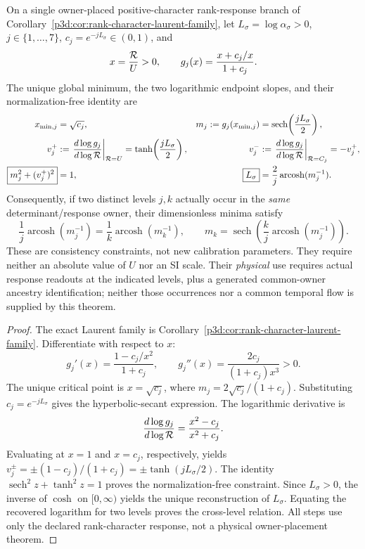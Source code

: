 \documentclass[12pt,a4paper]{article}
\begin{document}
\begin{theorem}
\label{p3d:thm:v285-calibration-free-hierarchy-dip}
On a single owner-placed positive-character rank-response branch of
Corollary~\ref{p3d:cor:rank-character-laurent-family}, let
\(L_\sigma=\log\alpha_\sigma>0\), \(j\in\{1,\ldots,7\}\),
\(c_j=e^{-jL_\sigma}\in(0,1)\), and
\[
 x=\frac{\mathcal R}{U}>0,\qquad
 g_j(x)=\frac{x+c_j/x}{1+c_j}.
\]
The unique global minimum, the two logarithmic endpoint slopes, and their
normalization-free identity are
\begin{align}
\label{p3d:eq:v285-dip-and-slopes}
 x_{\min,j}&=\sqrt{c_j},&
 m_j:=g_j(x_{\min,j})
 &=\operatorname{sech}\!\left(\frac{jL_\sigma}{2}\right),\\
 v_j^+&:=\left.\frac{d\log g_j}{d\log\mathcal R}\right|_{\mathcal R=U}
 =\tanh\!\left(\frac{jL_\sigma}{2}\right),&
 v_j^-&:=\left.\frac{d\log g_j}{d\log\mathcal R}\right|_{\mathcal R=C_j}
 =-v_j^+,\\
 \boxed{m_j^2+(v_j^+)^2}&=1,&
 \boxed{L_\sigma}&=\frac2j\operatorname{arcosh}(m_j^{-1}).
\end{align}
Consequently, if two distinct levels \(j,k\) actually occur in the
\emph{same} determinant/response owner, their dimensionless minima satisfy
\[
 \boxed{\frac1j\operatorname{arcosh}(m_j^{-1})
       =\frac1k\operatorname{arcosh}(m_k^{-1})},
 \qquad
 m_k=\operatorname{sech}\!\left(\frac{k}{j}
       \operatorname{arcosh}(m_j^{-1})\right).
\]
These are consistency constraints, not new calibration parameters.  They
require neither an absolute value of \(U\) nor an SI scale.  Their
\emph{physical} use requires actual response readouts at the indicated
levels, plus a generated common-owner ancestry identification; neither
those occurrences nor a common temporal flow is supplied by this theorem.
\end{theorem}
\begin{proof}
The exact Laurent family is Corollary~\ref{p3d:cor:rank-character-laurent-family}.
Differentiate with respect to \(x\):
\[
 g_j'(x)=\frac{1-c_j/x^2}{1+c_j},\qquad
 g_j''(x)=\frac{2c_j}{(1+c_j)x^3}>0.
\]
The unique critical point is \(x=\sqrt{c_j}\), where
\(m_j=2\sqrt{c_j}/(1+c_j)\).  Substituting
\(c_j=e^{-jL_\sigma}\) gives the hyperbolic-secant expression.
The logarithmic derivative is
\[
 \frac{d\log g_j}{d\log\mathcal R}
 =\frac{x^2-c_j}{x^2+c_j}.
\]
Evaluating at \(x=1\) and \(x=c_j\), respectively, yields
\(v_j^\pm=\pm(1-c_j)/(1+c_j)
 =\pm\tanh(jL_\sigma/2)\).
The identity \(\operatorname{sech}^2 z+\tanh^2 z=1\) proves the
normalization-free constraint.  Since \(L_\sigma>0\), the inverse of
\(\cosh\) on \([0,\infty)\) yields the unique reconstruction of
\(L_\sigma\).  Equating the recovered logarithm for two levels proves
the cross-level relation.  All steps use only the declared rank-character
response, not a physical owner-placement theorem.
\end{proof}
\end{document}
